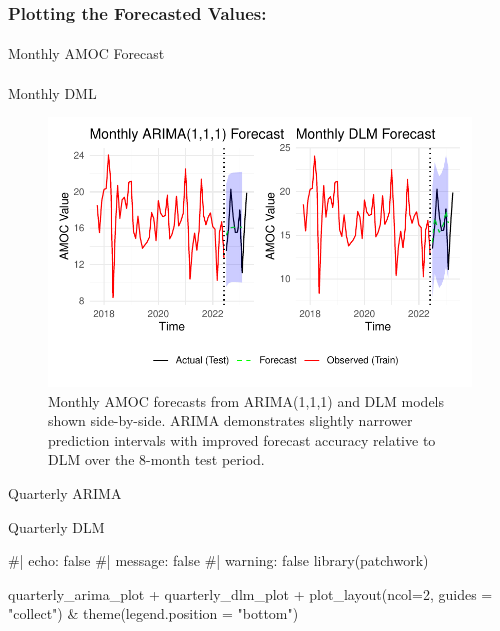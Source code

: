 \documentclass[
  11pt,
]{article}
\makeatletter
\let\oldparagraph\paragraph
\renewcommand{\paragraph}{
    \@ifstar
      \xxxParagraphStar
      \xxxParagraphNoStar
  }
\newcommand{\xxxParagraphStar}[1]{\oldparagraph*{#1}\mbox{}}
\newcommand{\xxxParagraphNoStar}[1]{\oldparagraph{#1}\mbox{}}
\newenvironment{Shaded}{\begin{snugshade}}{\end{snugshade}}
\newcommand{\AttributeTok}[1]{\textcolor[rgb]{0.40,0.45,0.13}{#1}}
\newcommand{\CommentTok}[1]{\textcolor[rgb]{0.37,0.37,0.37}{#1}}
\newcommand{\DecValTok}[1]{\textcolor[rgb]{0.68,0.00,0.00}{#1}}
\newcommand{\FunctionTok}[1]{\textcolor[rgb]{0.28,0.35,0.67}{#1}}
\newcommand{\NormalTok}[1]{\textcolor[rgb]{0.00,0.23,0.31}{#1}}
\newcommand{\SpecialCharTok}[1]{\textcolor[rgb]{0.37,0.37,0.37}{#1}}
\newcommand{\StringTok}[1]{\textcolor[rgb]{0.13,0.47,0.30}{#1}}
\makeatother
\begin{document}
\subsubsection{Plotting the Forecasted
Values:}\label{plotting-the-forecasted-values}

\paragraph{Monthly AMOC Forecast}\label{monthly-amoc-forecast}

\paragraph{Monthly DML}\label{monthly-dml}

\begin{figure}[H]

{\centering \includegraphics{project_files/figure-pdf/fig-monthlyforecast-1.pdf}

}

\caption{Monthly AMOC forecasts from ARIMA(1,1,1) and DLM models shown
side-by-side. ARIMA demonstrates slightly narrower prediction intervals
with improved forecast accuracy relative to DLM over the 8-month test
period.}

\end{figure}%

Quarterly ARIMA

Quarterly DLM

\begin{Shaded}
\begin{Highlighting}[]
\CommentTok{\#| echo: false}
\CommentTok{\#| message: false}
\CommentTok{\#| warning: false}
\FunctionTok{library}\NormalTok{(patchwork)}

\NormalTok{quarterly\_arima\_plot }\SpecialCharTok{+}\NormalTok{ quarterly\_dlm\_plot }\SpecialCharTok{+} 
  \FunctionTok{plot\_layout}\NormalTok{(}\AttributeTok{ncol=}\DecValTok{2}\NormalTok{, }\AttributeTok{guides =} \StringTok{"collect"}\NormalTok{) }\SpecialCharTok{\&} 
  \FunctionTok{theme}\NormalTok{(}\AttributeTok{legend.position =} \StringTok{"bottom"}\NormalTok{)}
\end{Highlighting}
\end{Shaded}
\end{document}
